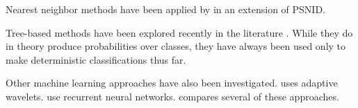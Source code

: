 \documentclass[12pt, onecolumn]{emulateapj}
\begin{document}
Nearest neighbor methods have been applied by \citet{Sako14} in an extension of PSNID.

Tree-based methods have been explored recently in the literature \citep{Richards11, Lochner16, Moller16}.  While they do in theory produce probabilities over classes, they have always been used only to make deterministic classifications thus far.  

Other machine learning approaches have also been investigated.  \citet{Varughese15} uses adaptive wavelets.  \citet{Karpenka12, Charnock16} use recurrent neural networks.  \citet{Lochner16} compares several of these approaches.




\end{document}
